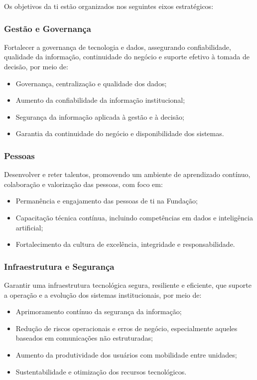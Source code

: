 \documentclass[12pt,a4paper]{article}
\begin{document}
Os objetivos da \gls{ti} estão organizados nos seguintes eixos estratégicos:

\subsubsection{Gestão e Governança}

Fortalecer a governança de tecnologia e dados, assegurando confiabilidade, qualidade da informação, continuidade do negócio e suporte efetivo à tomada de decisão, por meio de:
\begin{itemize}
  \item Governança, centralização e qualidade dos dados;
  \item Aumento da confiabilidade da informação institucional;
  \item Segurança da informação aplicada à gestão e à decisão;
  \item Garantia da continuidade do negócio e disponibilidade dos sistemas.
\end{itemize}

\subsubsection{Pessoas}

Desenvolver e reter talentos, promovendo um ambiente de aprendizado contínuo, colaboração e valorização das pessoas, com foco em:
\begin{itemize}
  \item Permanência e engajamento das pessoas de \gls{ti} na Fundação;
  \item Capacitação técnica contínua, incluindo competências em dados e inteligência artificial;
  \item Fortalecimento da cultura de excelência, integridade e responsabilidade.
\end{itemize}

\subsubsection{Infraestrutura e Segurança}

Garantir uma infraestrutura tecnológica segura, resiliente e eficiente, que suporte a operação e a evolução dos sistemas institucionais, por meio de:
\begin{itemize}
  \item Aprimoramento contínuo da segurança da informação;
  \item Redução de riscos operacionais e erros de negócio, especialmente aqueles baseados em comunicações não estruturadas;
  \item Aumento da produtividade dos usuários com mobilidade entre unidades;
  \item Sustentabilidade e otimização dos recursos tecnológicos.
\end{itemize}
\end{document}
